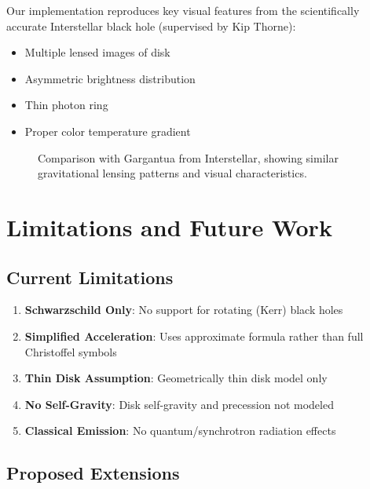\documentclass[12pt,a4paper]{article}
\theoremstyle{definition}
\theoremstyle{remark}
\begin{document}
Our implementation reproduces key visual features from the scientifically accurate Interstellar black hole (supervised by Kip Thorne):

\begin{itemize}
    \item Multiple lensed images of disk
    \item Asymmetric brightness distribution
    \item Thin photon ring
    \item Proper color temperature gradient
\end{itemize}

\begin{figure}[H]
    \centering
    \caption{Comparison with Gargantua from Interstellar, showing similar gravitational lensing patterns and visual characteristics.}
    \label{fig:interstellar_comparison}
\end{figure}

\section{Limitations and Future Work}

\subsection{Current Limitations}

\begin{enumerate}
    \item \textbf{Schwarzschild Only}: No support for rotating (Kerr) black holes
    \item \textbf{Simplified Acceleration}: Uses approximate formula rather than full Christoffel symbols
    \item \textbf{Thin Disk Assumption}: Geometrically thin disk model only
    \item \textbf{No Self-Gravity}: Disk self-gravity and precession not modeled
    \item \textbf{Classical Emission}: No quantum/synchrotron radiation effects
\end{enumerate}

\subsection{Proposed Extensions}
\end{document}
